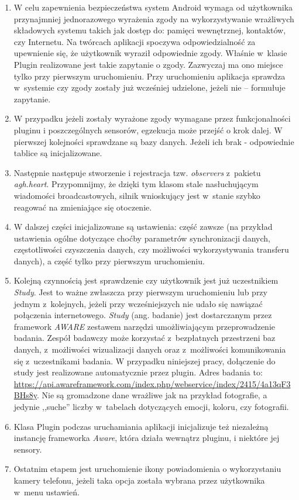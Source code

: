 \begin{enumerate}
	\item W celu zapewnienia bezpieczeństwa system Android wymaga od użytkownika przynajmniej jednorazowego wyrażenia zgody na wykorzystywanie wrażliwych składowych systemu takich jak dostęp do: pamięci wewnętrznej, kontaktów, czy Internetu. Na twórcach aplikacji spoczywa odpowiedzialność za upewnienie się, że użytkownik wyraził odpowiednie zgody. Właśnie w~klasie Plugin realizowane jest takie zapytanie o zgody. Zazwyczaj ma ono miejsce tylko przy pierwszym uruchomieniu. Przy uruchomieniu aplikacja sprawdza w~systemie czy zgody zostały już wcześniej udzielone, jeżeli nie -- formułuje zapytanie.
	
	\item W przypadku jeżeli zostały wyrażone zgody wymagane przez funkcjonalności pluginu i poszczególnych sensorów, egzekucja może przejść o krok dalej. W pierwszej kolejności sprawdzane są bazy danych. Jeżeli ich brak - odpowiednie tablice są inicjalizowane. 
	
	\item Następnie następuje stworzenie i rejestracja tzw. \textit{observers} z~pakietu \textit{agh.heart}. Przypomnijmy, że dzięki tym klasom stale nasłuchującym wiadomości broadcastowych, silnik wnioskujący jest w~stanie szybko reagować na zmieniające się otoczenie. 
	
	\item W dalszej części inicjalizowane są ustawienia: część zawsze (na przykład ustawienia ogólne dotyczące choćby parametrów synchronizacji danych, częstotliwości czyszczenia danych, czy możliwości wykorzystywania transferu danych), a część tylko przy pierwszym uruchomieniu.
	
	\item Kolejną czynnością jest sprawdzenie czy użytkownik jest już uczestnikiem \textit{Study}. Jest to ważne zwłaszcza przy pierwszym uruchomieniu lub przy jednym z~kolejnych, jeżeli przy wcześniejszych nie udało się nawiązać połączenia internetowego. \textit{Study} (ang. badanie) jest dostarczanym przez framework \textit{AWARE} zestawem narzędzi umożliwiającym przeprowadzenie badania. Zespół badawczy może korzystać z~bezpłatnych przestrzeni baz danych, z~możliwości wizualizacji danych oraz z~możliwości komunikowania się z~uczestnikami badania. W przypadku niniejszej pracy, dołączenie do study jest realizowane automatycznie przez plugin. Adres badania to: \url{https://api.awareframework.com/index.php/webservice/index/2415/4a13qF3BHs8y}. Nie są gromadzone dane wrażliwe jak na przykład fotografie, a jedynie ,,suche'' liczby w~tabelach dotyczących emocji, koloru, czy fotografii.
	
	\item Klasa Plugin podczas uruchamiania aplikacji inicjalizuje też niezależną instancję frameworka \textit{Aware}, która działa wewnątrz pluginu, i niektóre jej sensory.
	
	\item Ostatnim etapem jest uruchomienie ikony powiadomienia o wykorzystaniu kamery telefonu, jeżeli taka opcja została wybrana przez użytkownika w~menu ustawień.
\end{enumerate}

